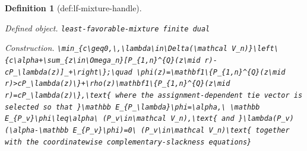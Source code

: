 \documentclass{article}
\newtheorem{definition}{Definition}
\begin{document}
\begin{definition}[def:lf-mixture-handle]\label{def:lf-mixture-handle}
\par\smallskip\noindent\emph{Defined object.} \texttt{least-\allowbreak{}favorable-\allowbreak{}mixture finite dual}
\par\smallskip\noindent\emph{Construction.} \texttt{\textbackslash{}\allowbreak{}min\_\allowbreak{}\{c\textbackslash{}\allowbreak{}geq0,\allowbreak{}\textbackslash{}\allowbreak{},\allowbreak{}\textbackslash{}\allowbreak{}lambda\textbackslash{}\allowbreak{}in\textbackslash{}\allowbreak{}Delta(\textbackslash{}\allowbreak{}mathcal V\_\allowbreak{}n)\}\allowbreak{}\textbackslash{}\allowbreak{}left\textbackslash{}\allowbreak{}\{c\textbackslash{}\allowbreak{}alpha+\allowbreak{}\textbackslash{}\allowbreak{}sum\_\allowbreak{}\{z\textbackslash{}\allowbreak{}in\textbackslash{}\allowbreak{}Omega\_\allowbreak{}n\}\allowbreak{}[P\_\allowbreak{}\{1,\allowbreak{}n\}\allowbreak{}\textasciicircum{}\{Q\}\allowbreak{}(z\textbackslash{}\allowbreak{}mid r)-\allowbreak{}cP\_\allowbreak{}\textbackslash{}\allowbreak{}lambda(z)]\_\allowbreak{}+\allowbreak{}\textbackslash{}\allowbreak{}right\textbackslash{}\allowbreak{}\}\allowbreak{};\allowbreak{}\textbackslash{}\allowbreak{}quad \textbackslash{}\allowbreak{}phi(z)=\allowbreak{}\textbackslash{}\allowbreak{}mathbf1\textbackslash{}\allowbreak{}\{P\_\allowbreak{}\{1,\allowbreak{}n\}\allowbreak{}\textasciicircum{}\{Q\}\allowbreak{}(z\textbackslash{}\allowbreak{}mid r)>cP\_\allowbreak{}\textbackslash{}\allowbreak{}lambda(z)\textbackslash{}\allowbreak{}\}\allowbreak{}+\allowbreak{}\textbackslash{}\allowbreak{}rho(z)\textbackslash{}\allowbreak{}mathbf1\textbackslash{}\allowbreak{}\{P\_\allowbreak{}\{1,\allowbreak{}n\}\allowbreak{}\textasciicircum{}\{Q\}\allowbreak{}(z\textbackslash{}\allowbreak{}mid r)=\allowbreak{}cP\_\allowbreak{}\textbackslash{}\allowbreak{}lambda(z)\textbackslash{}\allowbreak{}\}\allowbreak{},\allowbreak{}\textbackslash{}\allowbreak{}text\{ where the assignment-\allowbreak{}dependent tie vector is selected so that \}\allowbreak{}\textbackslash{}\allowbreak{}mathbb E\_\allowbreak{}\{P\_\allowbreak{}\textbackslash{}\allowbreak{}lambda\}\allowbreak{}\textbackslash{}\allowbreak{}phi=\allowbreak{}\textbackslash{}\allowbreak{}alpha,\allowbreak{}\textbackslash{}\allowbreak{} \textbackslash{}\allowbreak{}mathbb E\_\allowbreak{}\{P\_\allowbreak{}v\}\allowbreak{}\textbackslash{}\allowbreak{}phi\textbackslash{}\allowbreak{}leq\textbackslash{}\allowbreak{}alpha\textbackslash{}\allowbreak{} (P\_\allowbreak{}v\textbackslash{}\allowbreak{}in\textbackslash{}\allowbreak{}mathcal V\_\allowbreak{}n),\allowbreak{}\textbackslash{}\allowbreak{}text\{ and \}\allowbreak{}\textbackslash{}\allowbreak{}lambda(P\_\allowbreak{}v)(\textbackslash{}\allowbreak{}alpha-\allowbreak{}\textbackslash{}\allowbreak{}mathbb E\_\allowbreak{}\{P\_\allowbreak{}v\}\allowbreak{}\textbackslash{}\allowbreak{}phi)=\allowbreak{}0\textbackslash{}\allowbreak{} (P\_\allowbreak{}v\textbackslash{}\allowbreak{}in\textbackslash{}\allowbreak{}mathcal V\_\allowbreak{}n)\textbackslash{}\allowbreak{}text\{ together with the coordinatewise complementary-\allowbreak{}slackness equations\}\allowbreak{}}

\end{definition}
\end{document}
